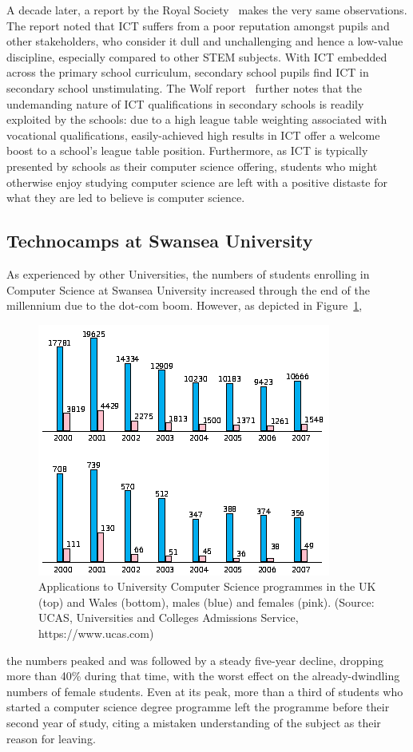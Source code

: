 \documentclass{sig-alternate}
\begin{document}
A decade later, a report by the Royal Society~\cite{RoyalSoc:2012}
makes the very same observations.  The report noted that ICT suffers
from a poor reputation amongst pupils and other stakeholders, who
consider it dull and unchallenging and hence a low-value discipline,
especially compared to other STEM subjects.  With ICT embedded across
the primary school curriculum, secondary school pupils find ICT in
secondary school unstimulating.  The Wolf report~\cite{Wolf:2011}
further notes that the undemanding nature of ICT qualifications in
secondary schools is readily exploited by the schools: due to a high
league table weighting associated with vocational qualifications,
easily-achieved high results in ICT offer a welcome boost to a
school's league table position.  Furthermore, as ICT is typically
presented by schools as their computer science offering, students who
might otherwise enjoy studying computer science are left with a
positive distaste for what they are led to believe is computer science.

\subsection{Technocamps at Swansea University}
As experienced by other Universities,
the numbers of students enrolling in Computer Science
at Swansea University increased through the end
of the millennium due to the dot-com boom.
However, as depicted in Figure~\ref{fig:numbers},
\begin{figure}
  \centering
  \includegraphics[width=0.9\columnwidth]{images/numbers.png}
  \caption{Applications to University Computer Science programmes
           in the UK (top) and Wales (bottom), males (blue) and females (pink).
           (Source: UCAS, Universities and Colleges Admissions Service,
            https://www.ucas.com)}
  \label{fig:numbers}
\end{figure}
the numbers peaked and was followed by
a steady five-year decline, dropping more than 40\% during that time,
with the worst effect on the already-dwindling numbers
of female students.
Even at its peak, more than a third of students who
started a computer science degree programme left
the programme before their second year of study,
citing a mistaken understanding of the subject
as their reason for leaving.
\end{document}
